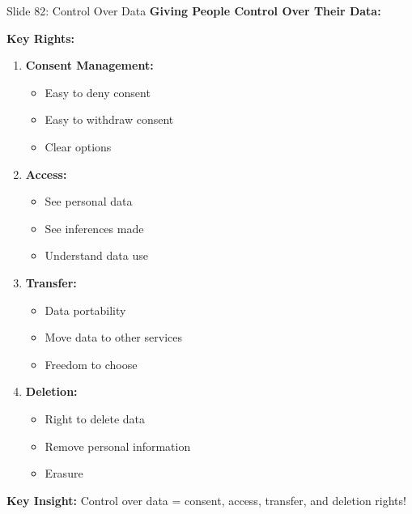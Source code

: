 \documentclass[8pt]{beamer}
\begin{document}
	\begin{frame}{Slide 82: Control Over Data}
		\fontsize{6.5}{7.5}\selectfont
		\textbf{Giving People Control Over Their Data:}
		
		\vspace{0.1cm}
		\textbf{Key Rights:}
		\begin{enumerate}
			\item \textbf{Consent Management:}
			\begin{itemize}
				\item Easy to deny consent
				\item Easy to withdraw consent
				\item Clear options
			\end{itemize}
			\item \textbf{Access:}
			\begin{itemize}
				\item See personal data
				\item See inferences made
				\item Understand data use
			\end{itemize}
			\item \textbf{Transfer:}
			\begin{itemize}
				\item Data portability
				\item Move data to other services
				\item Freedom to choose
			\end{itemize}
			\item \textbf{Deletion:}
			\begin{itemize}
				\item Right to delete data
				\item Remove personal information
				\item Erasure
			\end{itemize}
		\end{enumerate}
		
		\textcolor{myblue}{\textbf{Key Insight:}} Control over data = \textcolor{myblue}{consent, access, transfer, and deletion rights}!
	\end{frame}
	
\end{document}
